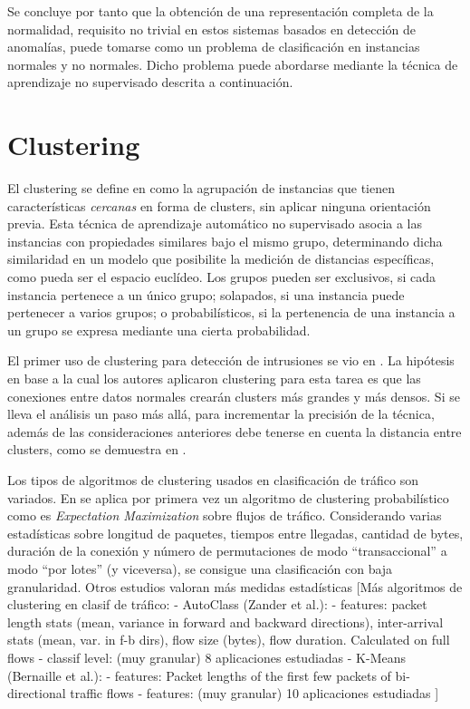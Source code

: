 Se concluye por tanto que la obtención de una representación completa de la normalidad, requisito no trivial en estos sistemas basados en detección de anomalías, puede tomarse como
un problema de clasificación en instancias normales y no normales. Dicho problema puede abordarse mediante la técnica de aprendizaje no supervisado descrita a continuación.

\section{Clustering}\label{clustering}

El clustering se define en \cite{NA08} como la agrupación de instancias que tienen características \emph{cercanas} en forma de clusters, sin aplicar ninguna orientación previa.
Esta técnica de aprendizaje automático no supervisado asocia a las instancias con propiedades similares bajo el mismo grupo,
determinando dicha similaridad en un modelo que posibilite la medición de distancias específicas, como pueda ser el espacio euclídeo.
Los grupos pueden ser exclusivos, si cada instancia pertenece a un único grupo; solapados, si una instancia puede pertenecer a varios grupos; o probabilísticos, si la pertenencia de una instancia a un grupo se expresa mediante una cierta probabilidad.

El primer uso de clustering para detección de intrusiones se vio en \cite{Portnoy_2000}.
La hipótesis en base a la cual los autores aplicaron clustering para esta tarea es que las conexiones entre datos normales crearán clusters más grandes y más densos.
Si se lleva el análisis un paso más allá, para incrementar la precisión de la técnica, además de las consideraciones anteriores debe tenerse en cuenta la distancia entre clusters, como se demuestra en \cite{JSW+06}.

Los tipos de algoritmos de clustering usados en clasificación de tráfico son variados.
En \cite{MHL+04} se aplica por primera vez un algoritmo de clustering probabilístico como es \emph{Expectation Maximization} sobre flujos de tráfico.
Considerando varias estadísticas sobre longitud de paquetes, tiempos entre llegadas, cantidad de bytes, duración de la conexión y número de permutaciones de modo ``transaccional'' a modo ``por lotes'' (y viceversa),
se consigue una clasificación con baja granularidad.
Otros estudios valoran más medidas estadísticas
[Más algoritmos de clustering en clasif de tráfico:
- AutoClass (Zander et al.):
    - features: packet length stats (mean, variance in forward and backward directions), inter-arrival stats (mean, var. in f-b dirs), flow size (bytes), flow duration. Calculated on full flows
    - classif level: (muy granular) 8 aplicaciones estudiadas
- K-Means (Bernaille et al.):
    - features: Packet lengths of the first few packets of bi-directional traffic flows
    - features: (muy granular) 10 aplicaciones estudiadas
]

